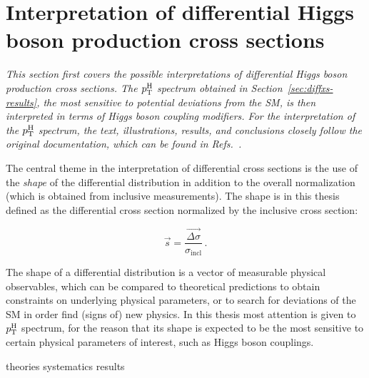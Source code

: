 \section{Interpretation of differential Higgs boson production cross sections}
\label{sec:interpretation}

\emph{%
This section first covers the possible interpretations of differential Higgs boson production cross sections.
%
The $p_\mathrm{T}^\mathrm{H}$ spectrum obtained in Section~\ref{sec:diffxs-results}, the most sensitive to potential deviations from the SM, is then interpreted in terms of Higgs boson coupling modifiers.
% 
For the interpretation of the $p_\mathrm{T}^\mathrm{H}$ spectrum, the text, illustrations, results, and conclusions closely follow the original documentation, which can be found in Refs.~\cite{AN-17-244,HIG-17-028}.
}


The central theme in the interpretation of differential cross sections is the use of the \emph{shape} of the differential distribution in addition to the overall normalization (which is obtained from inclusive measurements).
% 
The shape is in this thesis defined as the differential cross section normalized by the inclusive cross section:
% 
\begin{linenomath*}
\begin{equation}
\vec{s} = \frac{\vec{\Delta\sigma}}{\sigma_\text{incl}}
\,.
\end{equation}
\end{linenomath*}
% 
The shape of a differential distribution is a vector of measurable physical observables, which can be compared to theoretical predictions to obtain constraints on underlying physical parameters, or to search for deviations of the SM in order find (signs of) new physics.
% 
In this thesis most attention is given to $p_\mathrm{T}^\mathrm{H}$ spectrum, for the reason that its shape is expected to be the most sensitive to certain physical parameters of interest, such as Higgs boson couplings.



{theories}
{systematics}
{results}